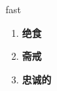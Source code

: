 
\begin{frame}
{\huge fast}
\begin{center}
\begin{enumerate}\Large
  \item \textbf{绝食}
  \item \textbf{斋戒}
  \item \textbf{忠诚的}
\end{enumerate}
\end{center}
\end{frame}
